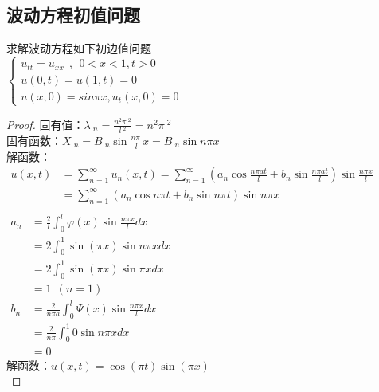 \subsection{波动方程初值问题}
\begin{example} %
	求解波动方程如下初边值问题\\
	$\displaystyle  \begin{cases}
		u_{tt} =u_{xx} ~~,~~ 0<x<1, t>0\\
		u(0,t) =u(1,t)=0 \\
		u(x,0) =sin \pi x, u_t (x,0)=0 
	\end{cases}$ \\	
	\begin{proof} 
	固有值：$\displaystyle  \lambda~_n=\frac{n^2\pi~^2}{l~^2 }= n^2\pi~^2 $ \\ 
	固有函数：$\displaystyle  X~_n=B~_n \sin \frac{n\pi~}{l} x=B~_n \sin n\pi x $\\
	解函数：\\ 
		$\begin{array}{llll}
			u(x,t)&=\sum_{n=1}^{\infty } u_n(x,t) = \sum_{n=1}^{\infty }  (a_n\cos\frac{ n\pi at}{l}+ b_n\sin \frac{ n\pi at}{l}) \sin \frac{ n\pi x}{l}\\
			        &= \sum_{n=1}^{\infty }  (a_n\cos n\pi t+ b_n\sin n\pi t ) \sin n\pi x \\
		\end{array}$ \\ 
	
		$\begin{array}{lllllllll}
		a_n&=  \frac{2}{l} \int_{0 }^{l}  \varphi (x) \sin \frac{ n\pi x}{l} dx \\
		       &= 2 \int_{0 }^{1}  \sin(\pi x) \sin n\pi x dx \\
		       &= 2 \int_{0 }^{1}  \sin(\pi x) \sin \pi x dx  \\
		       &=1~~  (n=1)   \\
		b_n&= \frac{2} { n\pi a} \int_{0 }^{l}  \Psi  (x) \sin \frac{ n\pi x}{l} dx  \\
		       &= \frac{2} { n\pi} \int_{0 }^{1}  0  \sin n\pi x dx  \\
			   &=0
		\end{array}$ \\ 
		解函数：$\displaystyle  u(x,t) = \cos(\pi t) \sin(\pi x)   $\\
	\end{proof}
\end{example}

